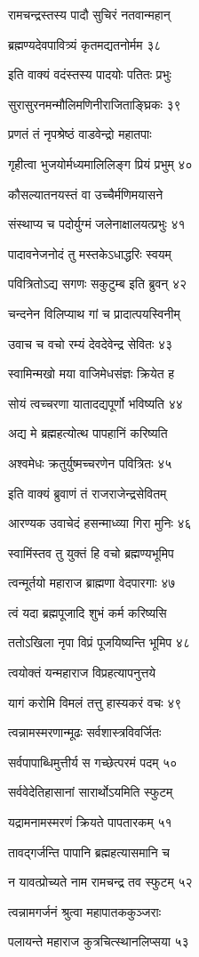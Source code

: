 रामचन्द्रस्तस्य पादौ सुचिरं नतवान्महान्

ब्रह्मण्यदेवपावित्र्यं कृतमद्यतनोर्मम ३८

इति वाक्यं वदंस्तस्य पादयोः पतितः प्रभुः

सुरासुरनमन्मौलिमणिनीराजिताङ्घ्रिकः ३९

प्रणतं तं नृपश्रेष्ठं वाडवेन्द्रो महातपाः

गृहीत्वा भुजयोर्मध्यमालिलिङ्ग प्रियं प्रभुम् ४०

कौसल्यातनयस्तं वा उच्चैर्मणिमयासने

संस्थाप्य च पदोर्युग्मं जलेनाक्षालयत्प्रभुः ४१

पादावनेजनोदं तु मस्तकेऽधाद्धरिः स्वयम्

पवित्रितोऽद्य सगणः सकुटुम्ब इति ब्रुवन् ४२

चन्दनेन विलिप्याथ गां च प्रादात्पयस्विनीम्

उवाच च वचो रम्यं देवदेवेन्द्र सेवितः ४३

स्वामिन्मखो मया वाजिमेधसंज्ञः क्रियेत ह

सोयं त्वच्चरणा यातादद्यपूर्णो भविष्यति ४४

अद्य मे ब्रह्महत्योत्थ पापहानिं करिष्यति

अश्वमेधः क्रतुर्युष्मच्चरणेन पवित्रितः ४५

इति वाक्यं ब्रुवाणं तं राजराजेन्द्रसेवितम्

आरण्यक उवाचेदं हसन्माध्व्या गिरा मुनिः ४६

स्वामिंस्तव तु युक्तं हि वचो ब्रह्मण्यभूमिप

त्वन्मूर्तयो महाराज ब्राह्मणा वेदपारगाः ४७

त्वं यदा ब्रह्मपूजादि शुभं कर्म करिष्यसि

ततोऽखिला नृपा विप्रं पूजयिष्यन्ति भूमिप ४८

त्वयोक्तं यन्महाराज विप्रहत्यापनुत्तये

यागं करोमि विमलं तत्तु हास्यकरं वचः ४९

त्वन्नामस्मरणान्मूढः सर्वशास्त्रविवर्जितः

सर्वपापाब्धिमुत्तीर्य स गच्छेत्परमं पदम् ५०

सर्ववेदेतिहासानां सारार्थोऽयमिति स्फुटम्

यद्रामनामस्मरणं क्रियते पापतारकम् ५१

तावद्गर्जन्ति पापानि ब्रह्महत्यासमानि च

न यावत्प्रोच्यते नाम रामचन्द्र तव स्फुटम् ५२

त्वन्नामगर्जनं श्रुत्वा महापातककुञ्जराः

पलायन्ते महाराज कुत्रचित्स्थानलिप्सया ५३

